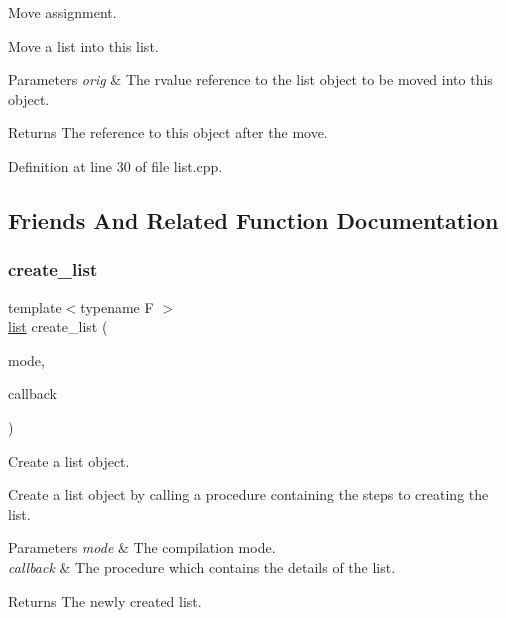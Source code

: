 Move assignment. 

Move a list into this list.


\begin{DoxyParams}{Parameters}
{\em orig} & The rvalue reference to the list object to be moved into this object. \\
\hline
\end{DoxyParams}
\begin{DoxyReturn}{Returns}
The reference to this object after the move. 
\end{DoxyReturn}


Definition at line 30 of file list.\+cpp.



\subsection{Friends And Related Function Documentation}
\mbox{\label{classglpp_1_1list_a627197fd6510c899fb15354dae0ee58c}} 
\subsubsection{\texorpdfstring{create\+\_\+list}{create\_list}}
{\footnotesize\ttfamily template$<$typename F $>$ \\
\hyperlink{classglpp_1_1list}{list} create\+\_\+list (\begin{DoxyParamCaption}\item[{\hyperlink{namespaceglpp_ae04b58b8004d97440233b5c65fe75748}{list\+\_\+mode}}]{mode,  }\item[{F}]{callback }\end{DoxyParamCaption})\hspace{0.3cm}{\ttfamily [friend]}}



Create a list object. 

Create a list object by calling a procedure containing the steps to creating the list.


\begin{DoxyParams}{Parameters}
{\em mode} & The compilation mode. \\
\hline
{\em callback} & The procedure which contains the details of the list. \\
\hline
\end{DoxyParams}
\begin{DoxyReturn}{Returns}
The newly created list. 
\end{DoxyReturn}

